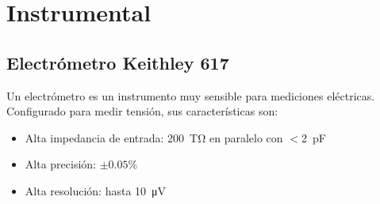 \section{Instrumental}
\subsection{Electrómetro Keithley 617}
Un electrómetro es un instrumento muy sensible para mediciones eléctricas.
Configurado para medir tensión, sus características son:
\begin{itemize}
    \item Alta impedancia de entrada:
\SI{200}{\tera\ohm} en paralelo con $<$\SI{2}{\pico\farad}
\item Alta precisión: $\pm0.05\%$
\item Alta resolución: hasta \SI{10}{\micro\volt}
\end{itemize}
